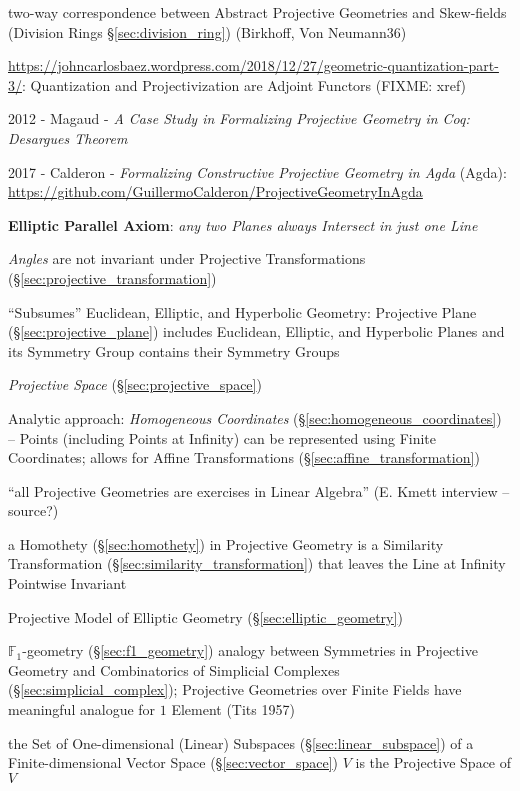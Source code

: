two-way correspondence between Abstract Projective Geometries and Skew-fields
(Division Rings \S\ref{sec:division_ring}) (Birkhoff, Von Neumann36)

\url{https://johncarlosbaez.wordpress.com/2018/12/27/geometric-quantization-part-3/}:
Quantization and Projectivization are Adjoint Functors (FIXME: xref)

2012 - Magaud - \emph{A Case Study in Formalizing Projective Geometry in Coq:
Desargues Theorem}

2017 - Calderon - \emph{Formalizing Constructive Projective Geometry in Agda}
(Agda): \url{https://github.com/GuillermoCalderon/ProjectiveGeometryInAgda}

\textbf{Elliptic Parallel Axiom}: \emph{any two Planes always Intersect in just
  one Line}

\emph{Angles} are not invariant under Projective Transformations
(\S\ref{sec:projective_transformation})

``Subsumes'' Euclidean, Elliptic, and Hyperbolic Geometry: Projective
Plane (\S\ref{sec:projective_plane}) includes Euclidean, Elliptic, and
Hyperbolic Planes and its Symmetry Group contains their Symmetry
Groups

\emph{Projective Space} (\S\ref{sec:projective_space})

Analytic approach: \emph{Homogeneous Coordinates}
(\S\ref{sec:homogeneous_coordinates}) -- Points (including Points at Infinity)
can be represented using Finite Coordinates; allows for Affine Transformations
(\S\ref{sec:affine_transformation}) %

``all Projective Geometries are exercises in Linear Algebra'' (E.
Kmett interview -- source?) %

a Homothety (\S\ref{sec:homothety}) in Projective Geometry is a Similarity
Transformation (\S\ref{sec:similarity_transformation}) that leaves the Line at
Infinity Pointwise Invariant

Projective Model of Elliptic Geometry (\S\ref{sec:elliptic_geometry})

\fist $\mathbb{F}_1$-geometry (\S\ref{sec:f1_geometry}) analogy between
Symmetries in Projective Geometry and Combinatorics of Simplicial Complexes
(\S\ref{sec:simplicial_complex}); Projective Geometries over Finite Fields have
meaningful analogue for $1$ Element (Tits 1957)

\fist the Set of One-dimensional (Linear) Subspaces
(\S\ref{sec:linear_subspace}) of a Finite-dimensional Vector Space
(\S\ref{sec:vector_space}) $V$ is the Projective Space of $V$



